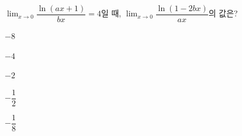 $\displaystyle\lim_{x\to 0}\dfrac{\ln(ax+1)}{bx}=4$일 때, $\displaystyle\lim_{x\to 0}\dfrac{\ln(1-2bx)}{ax}$의 값은? 
\begin{choices32}{\rule[-3ex]{0pt}{8ex}$-8$}{\rule[-3ex]{0pt}{8ex}$-4$}{\rule[-3ex]{0pt}{8ex}$-2$}{\rule[-3ex]{0pt}{8ex}$-\dfrac{1}{2}$}{\rule[-3ex]{0pt}{8ex}$-\dfrac{1}{8}$}\end{choices32}
